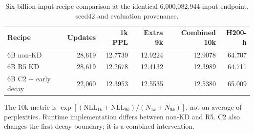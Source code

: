 \begin{table}[tbp]
\centering
\small
\caption{Six-billion-input recipe comparison at the identical 6,000,082,944-input endpoint, seed42 and evaluation provenance.}
\label{tab:final6b}
\begin{tabular}{lrrrrr}
\toprule
Recipe & Updates & 1k PPL & Extra 9k & Combined 10k & H200-h \\
\midrule
6B non-KD & 28,619 & 12.7739 & 12.9224 & 12.9078 & 64.707 \\
6B R5 KD & 28,619 & 12.2678 & 12.4132 & 12.3989 & 64.711 \\
6B C2 + early decay & 22,060 & 12.3953 & 12.5535 & 12.5380 & 65.009 \\
\bottomrule
\end{tabular}
\par\vspace{3pt}\begin{minipage}{\linewidth}\footnotesize The 10k metric is $\exp[(\mathrm{NLL}_{1k}+\mathrm{NLL}_{9k})/(N_{1k}+N_{9k})]$, not an average of perplexities. Runtime implementation differs between non-KD and R5. C2 also changes the first decay boundary; it is a combined intervention.\end{minipage}
\end{table}
